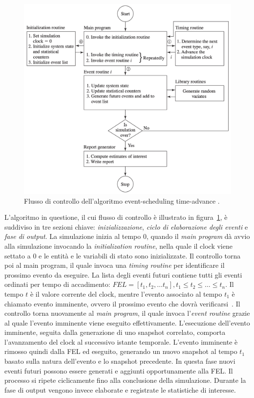 \documentclass[12pt,a4paper,openright,twoside]{book}
\begin{document}
\begin{figure}
    \centering
    \includegraphics[width=.80\linewidth]{figures/discrete-event-simulation/time-advance-flow.png}
    \caption{Flusso di controllo dell'algoritmo event-scheduling time-advance \cite{Law15}.}
    \label{fig:next-event-flow}
\end{figure}

L'algoritmo in questione, il cui flusso di controllo è illustrato in figura~\ref{fig:next-event-flow}, è suddiviso in tre sezioni chiave: \textit{inizializzazione}, \textit{ciclo di elaborazione degli eventi} e \textit{fase di output}.
La simulazione inizia al tempo 0, quando il \textit{main program} dà avvio alla simulazione invocando la \textit{initialization routine}, nella quale il clock viene settato a 0 e le entità e le variabili di stato sono inizializzate.
Il controllo torna poi al main program, il quale invoca una \textit{timing routine} per identificare il prossimo evento da eseguire.
La lista degli eventi futuri contiene tutti gli eventi ordinati per tempo di accadimento: $FEL = [t_1, t_2, \dots t_n], t_1 \leq t_2 \leq \dots \leq t_n$. 
Il tempo $t$ è il valore corrente del clock, mentre l'evento associato al tempo $t_1$ è chiamato evento imminente, ovvero il prossimo evento che dovrà verificarsi~\cite{DBLP:books/daglib/0034857}.
Il controllo torna nuovamente al \textit{main program}, il quale invoca l'\textit{event routine} grazie al quale l'evento imminente viene eseguito effettivamente. 
L'esecuzione dell'evento imminente, seguita dalla generazione di uno snapshot correlato, comporta l'avanzamento del clock al successivo istante temporale. L'evento imminente è rimosso quindi dalla FEL ed eseguito, generando un nuovo snapshot al tempo $t_1$ basato sulla natura dell'evento e lo snapshot precedente. In questa fase nuovi eventi futuri possono essere generati e aggiunti opportunamente alla FEL.
Il processo si ripete ciclicamente fino alla conclusione della simulazione. 
Durante la fase di output vengono invece elaborate e registrate le statistiche di interesse. 
\end{document}
